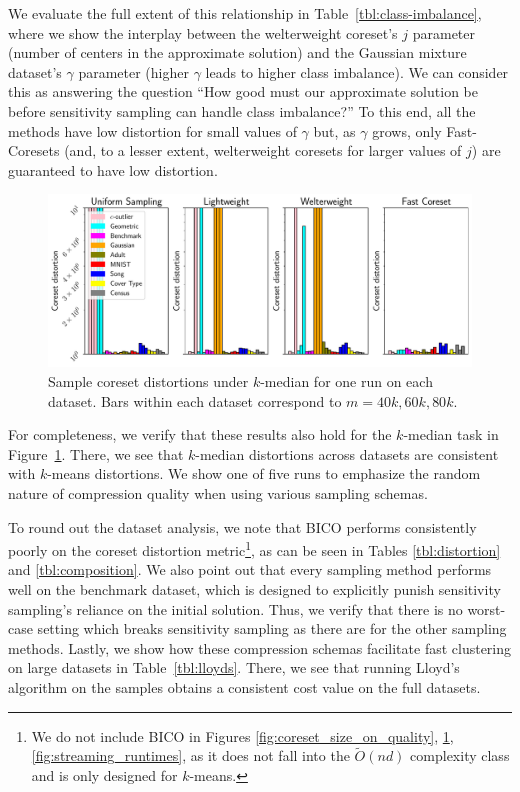 

We evaluate the full extent of this relationship in Table~\ref{tbl:class-imbalance}, where we show the interplay between the welterweight coreset's $j$
parameter (number of centers in the approximate solution) and the Gaussian mixture dataset's $\gamma$ parameter (higher $\gamma$ leads to higher class
imbalance). We can consider this as answering the question ``How good must our approximate solution be before sensitivity sampling can handle class imbalance?''
To this end, all the methods have low distortion for small values of $\gamma$ but, as $\gamma$ grows, only Fast-Coresets (and, to a lesser extent,
welterweight coresets for larger values of $j$) are guaranteed to have low distortion.

\begin{figure}
    \centering
    \includegraphics[width=\linewidth]{images/1/coreset_distortion-m_scalar_across_all_algorithms.pdf}
    \vspace*{-0.6cm}
    \caption{Sample coreset distortions under $k$-median for one run on each dataset. Bars within each dataset correspond to $m=40k, 60k, 80k$.}
    \label{subfig:kmedian_distortion}
\end{figure}
For completeness, we verify that these results also hold for the $k$-median task in Figure~\ref{subfig:kmedian_distortion}. There, we see that $k$-median
distortions across datasets are consistent with $k$-means distortions. We show one of five runs to emphasize the random nature of compression quality when using
various sampling schemas.

To round out the dataset analysis, we note that BICO performs consistently poorly on the coreset distortion metric\footnote{We do not include BICO in Figures
\ref{fig:coreset_size_on_quality}, \ref{subfig:kmedian_distortion}, \ref{fig:streaming_runtimes},  as it does not fall into the $\tilde{O}(nd)$ complexity class
and is only designed for $k$-means.}, as can be seen in Tables \ref{tbl:distortion} and \ref{tbl:composition}. We also point out that every sampling method
performs well on the benchmark dataset, which is designed to explicitly punish sensitivity sampling's reliance on the initial solution. Thus, we verify that
there is no worst-case setting which breaks sensitivity sampling as there are for the other sampling methods.  Lastly, we show how these compression schemas
facilitate fast clustering on large datasets in Table~\ref{tbl:lloyds}. There, we see that running Lloyd's algorithm on the samples obtains a consistent cost
value on the full datasets.

